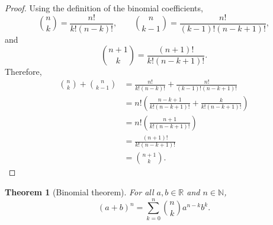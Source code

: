 \documentclass{article}
\newtheorem{theorem}{Theorem}
\theoremstyle{definition}
\begin{document}
\begin{proof}
Using the definition of the binomial coefficients,
\[
\binom{n}{k}=\frac{n!}{k!(n-k)!},
\qquad
\binom{n}{k-1}=\frac{n!}{(k-1)!(n-k+1)!},
\]
and
\[
\binom{n+1}{k}=\frac{(n+1)!}{k!(n-k+1)!}.
\]
Therefore,
\begin{align*}
\binom{n}{k}+\binom{n}{k-1}
&=\frac{n!}{k!(n-k)!}
  +\frac{n!}{(k-1)!(n-k+1)!}\\[4pt]
&=n!\left(
  \frac{n-k+1}{k!(n-k+1)!}
  +\frac{k}{k!(n-k+1)!}
  \right)\\[4pt]
&=n!\left(\frac{n+1}{k!(n-k+1)!}\right)\\[4pt]
&=\frac{(n+1)!}{k!(n-k+1)!}\\[4pt]
&=\binom{n+1}{k}.
\end{align*}
\end{proof}

\begin{theorem}[Binomial theorem]
For all \(a,b\in\mathbb{R}\) and \(n\in\mathbb{N}\),
\[
(a+b)^n=\sum_{k=0}^{n}\binom{n}{k}a^{n-k}b^k.
\]
\end{theorem}
\end{document}
